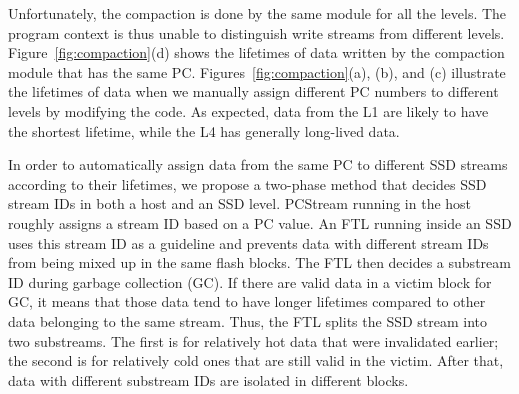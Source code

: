 Unfortunately, the compaction is done by the same module for all the levels.
The program context is thus unable to distinguish write streams from different
levels. Figure~\ref{fig:compaction}(d) shows the lifetimes of data written by
the compaction module that has the same PC.  Figures~\ref{fig:compaction}(a),
(b), and (c) illustrate the lifetimes of data when we manually assign different
PC numbers to different levels by modifying the code.  As expected, data from
the L1 are likely to have the shortest lifetime, while the L4 has generally
long-lived data.

In order to automatically assign data from the same PC to different SSD streams
according to their lifetimes, we propose a two-phase method that decides SSD
stream IDs in both a host and an SSD level.  PCStream running in the host
roughly assigns a stream ID based on a PC value.  An FTL running inside an SSD
uses this stream ID as a guideline and prevents data with different stream IDs
from being mixed up in the same flash blocks. The FTL then decides a substream
ID during garbage collection (GC). If there are valid data in a victim block
for GC, it means that those data tend to have longer lifetimes compared to
other data belonging to the same stream. Thus, the FTL splits the SSD stream
into two substreams.  The first is for relatively hot data that were
invalidated earlier; the second is for relatively cold ones that are still
valid in the victim.  After that, data with different substream IDs are
isolated in different blocks. 

